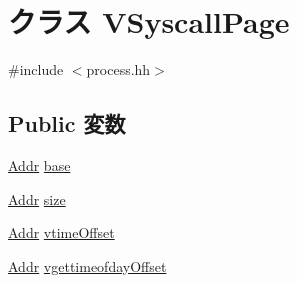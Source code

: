 \hypertarget{classX86ISA_1_1X86__64LiveProcess_1_1VSyscallPage}{
\section{クラス VSyscallPage}
\label{classX86ISA_1_1X86__64LiveProcess_1_1VSyscallPage}
}


{\ttfamily \#include $<$process.hh$>$}\subsection*{Public 変数}
\begin{DoxyCompactItemize}
\item 
\hyperlink{base_2types_8hh_af1bb03d6a4ee096394a6749f0a169232}{Addr} \hyperlink{classX86ISA_1_1X86__64LiveProcess_1_1VSyscallPage_acbb25a86d519ae439e2d01ddb0b85357}{base}
\item 
\hyperlink{base_2types_8hh_af1bb03d6a4ee096394a6749f0a169232}{Addr} \hyperlink{classX86ISA_1_1X86__64LiveProcess_1_1VSyscallPage_a8ce507144b5ef53350af753eafb669f0}{size}
\item 
\hyperlink{base_2types_8hh_af1bb03d6a4ee096394a6749f0a169232}{Addr} \hyperlink{classX86ISA_1_1X86__64LiveProcess_1_1VSyscallPage_a38977531bcb83545c3c54ab5e2edbb14}{vtimeOffset}
\item 
\hyperlink{base_2types_8hh_af1bb03d6a4ee096394a6749f0a169232}{Addr} \hyperlink{classX86ISA_1_1X86__64LiveProcess_1_1VSyscallPage_aa6dd91974e908006a2e736f7cc343abe}{vgettimeofdayOffset}
\end{DoxyCompactItemize}


